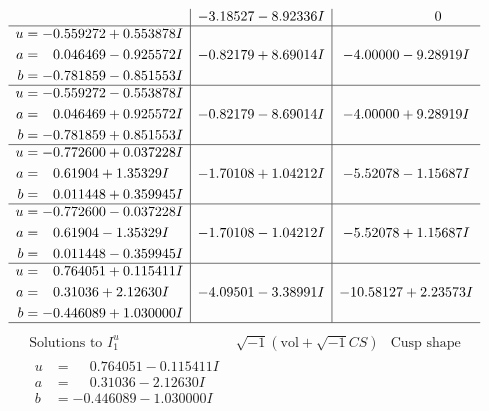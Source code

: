 \documentclass[1p]{elsarticle_modified}
\theoremstyle{definition}
\newcommand{\I}{\sqrt{-1}}
\begin{document}
$$\begin{array}{c|c|c}
 & -3.18527 - 8.92336 I & \phantom{-0.000000 } 0 \\ \hline\begin{aligned}
u &= -0.559272 + 0.553878 I \\
a &= \phantom{-}0.046469 - 0.925572 I \\
b &= -0.781859 - 0.851553 I\end{aligned}
 & -0.82179 + 8.69014 I & -4.00000 - 9.28919 I \\ \hline\begin{aligned}
u &= -0.559272 - 0.553878 I \\
a &= \phantom{-}0.046469 + 0.925572 I \\
b &= -0.781859 + 0.851553 I\end{aligned}
 & -0.82179 - 8.69014 I & -4.00000 + 9.28919 I \\ \hline\begin{aligned}
u &= -0.772600 + 0.037228 I \\
a &= \phantom{-}0.61904 + 1.35329 I \\
b &= \phantom{-}0.011448 + 0.359945 I\end{aligned}
 & -1.70108 + 1.04212 I & -5.52078 - 1.15687 I \\ \hline\begin{aligned}
u &= -0.772600 - 0.037228 I \\
a &= \phantom{-}0.61904 - 1.35329 I \\
b &= \phantom{-}0.011448 - 0.359945 I\end{aligned}
 & -1.70108 - 1.04212 I & -5.52078 + 1.15687 I \\ \hline\begin{aligned}
u &= \phantom{-}0.764051 + 0.115411 I \\
a &= \phantom{-}0.31036 + 2.12630 I \\
b &= -0.446089 + 1.030000 I\end{aligned}
 & -4.09501 - 3.38991 I & -10.58127 + 2.23573 I\\
 \hline 
 \end{array}$$\newpage$$\begin{array}{c|c|c}  
\text{Solutions to }I^u_{1}& \I (\text{vol} + \sqrt{-1}CS) & \text{Cusp shape}\\
 \hline 
\begin{aligned}
u &= \phantom{-}0.764051 - 0.115411 I \\
a &= \phantom{-}0.31036 - 2.12630 I \\
b &= -0.446089 - 1.030000 I\end{aligned}

\end{array}$$
\end{document}
